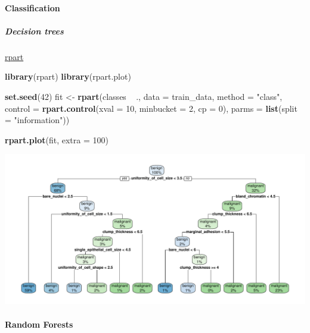 \documentclass[]{article}
\newenvironment{Shaded}{\begin{snugshade}}{\end{snugshade}}
\newcommand{\KeywordTok}[1]{\textcolor[rgb]{0.13,0.29,0.53}{\textbf{{#1}}}}
\newcommand{\DataTypeTok}[1]{\textcolor[rgb]{0.13,0.29,0.53}{{#1}}}
\newcommand{\DecValTok}[1]{\textcolor[rgb]{0.00,0.00,0.81}{{#1}}}
\newcommand{\StringTok}[1]{\textcolor[rgb]{0.31,0.60,0.02}{{#1}}}
\newcommand{\NormalTok}[1]{{#1}}
\let\oldparagraph\paragraph
\renewcommand{\paragraph}[1]{\oldparagraph{#1}\mbox{}}
\let\oldsubparagraph\subparagraph
\renewcommand{\subparagraph}[1]{\oldsubparagraph{#1}\mbox{}}
\begin{document}
\paragraph{Classification}\label{classification}

\subparagraph{Decision trees}\label{decision-trees}

\href{https://cran.r-project.org/web/packages/rpart/rpart.pdf}{rpart}

\begin{Shaded}
\begin{Highlighting}[]
\KeywordTok{library}\NormalTok{(rpart)}
\KeywordTok{library}\NormalTok{(rpart.plot)}

\KeywordTok{set.seed}\NormalTok{(}\DecValTok{42}\NormalTok{)}
\NormalTok{fit <-}\StringTok{ }\KeywordTok{rpart}\NormalTok{(classes ~}\StringTok{ }\NormalTok{.,}
            \DataTypeTok{data =} \NormalTok{train_data,}
            \DataTypeTok{method =} \StringTok{"class"}\NormalTok{,}
            \DataTypeTok{control =} \KeywordTok{rpart.control}\NormalTok{(}\DataTypeTok{xval =} \DecValTok{10}\NormalTok{, }
                                    \DataTypeTok{minbucket =} \DecValTok{2}\NormalTok{, }
                                    \DataTypeTok{cp =} \DecValTok{0}\NormalTok{), }
             \DataTypeTok{parms =} \KeywordTok{list}\NormalTok{(}\DataTypeTok{split =} \StringTok{"information"}\NormalTok{))}

\KeywordTok{rpart.plot}\NormalTok{(fit, }\DataTypeTok{extra =} \DecValTok{100}\NormalTok{)}
\end{Highlighting}
\end{Shaded}

\begin{center}\includegraphics{webinar_code_files/figure-latex/decision_tree-1} \end{center}

\paragraph{Random Forests}\label{random-forests}
\end{document}
